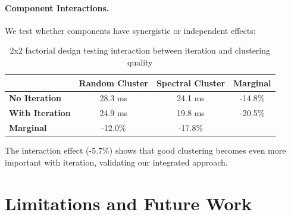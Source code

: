 \documentclass{article}
\begin{document}
\paragraph{Component Interactions.}
We test whether components have synergistic or independent effects:

\begin{table}[h]
\caption{2x2 factorial design testing interaction between iteration and 
clustering quality}
\centering
\begin{tabular}{lccc}
\toprule
& \textbf{Random Cluster} & \textbf{Spectral Cluster} & \textbf{Marginal} \\
\midrule
\textbf{No Iteration} & 28.3 ms & 24.1 ms & -14.8\% \\
\textbf{With Iteration} & 24.9 ms & 19.8 ms & -20.5\% \\
\midrule
\textbf{Marginal} & -12.0\% & -17.8\% & \\
\bottomrule
\end{tabular}
\end{table}

The interaction effect (-5.7\%) shows that good clustering becomes even 
more important with iteration, validating our integrated approach.

\section{Limitations and Future Work}
\label{sec:limitations}
\end{document}
